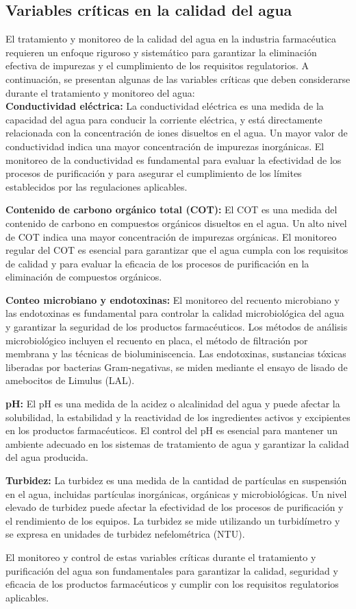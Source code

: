 \subsection{Variables críticas en la calidad del agua}

El tratamiento y monitoreo de la calidad del agua en la industria farmacéutica requieren un enfoque riguroso y sistemático para garantizar la eliminación efectiva de impurezas y el cumplimiento de los requisitos regulatorios. A continuación, se presentan algunas de las variables críticas que deben considerarse durante el tratamiento y monitoreo del agua:\\

\textbf{Conductividad eléctrica:} La conductividad eléctrica es una medida de la capacidad del agua para conducir la corriente eléctrica, y está directamente relacionada con la concentración de iones disueltos en el agua. Un mayor valor de conductividad indica una mayor concentración de impurezas inorgánicas. El monitoreo de la conductividad es fundamental para evaluar la efectividad de los procesos de purificación y para asegurar el cumplimiento de los límites establecidos por las regulaciones aplicables.

\textbf{Contenido de carbono orgánico total (COT):} El COT es una medida del contenido de carbono en compuestos
orgánicos disueltos en el agua. Un alto nivel de COT indica una mayor concentración de impurezas orgánicas.
El monitoreo regular del COT es esencial para garantizar que el agua cumpla con los requisitos de calidad y para evaluar la eficacia de los procesos de purificación en la eliminación de compuestos orgánicos.

\textbf{Conteo microbiano y endotoxinas:} El monitoreo del recuento microbiano y las endotoxinas es fundamental
para controlar la calidad microbiológica del agua y garantizar la seguridad de los productos farmacéuticos.
Los métodos de análisis microbiológico incluyen el recuento en placa, el método de filtración por membrana
y las técnicas de bioluminiscencia. Las endotoxinas, sustancias tóxicas liberadas por bacterias Gram-negativas,
se miden mediante el ensayo de lisado de amebocitos de Limulus (LAL).

\textbf{pH:} El pH es una medida de la acidez o alcalinidad del agua y puede afectar la solubilidad,
la estabilidad y la reactividad de los ingredientes activos y excipientes en los productos farmacéuticos.
El control del pH es esencial para mantener un ambiente adecuado en los sistemas de tratamiento de agua y
garantizar la calidad del agua producida.

\textbf{Turbidez:} La turbidez es una medida de la cantidad de partículas en suspensión en el agua, incluidas partículas inorgánicas, orgánicas y microbiológicas. Un nivel elevado de turbidez puede afectar la efectividad de los procesos de purificación y el rendimiento de los equipos. La turbidez se mide utilizando un turbidímetro y se expresa en unidades de turbidez nefelométrica (NTU).

El monitoreo y control de estas variables críticas durante el tratamiento y purificación del agua son fundamentales para garantizar la calidad, seguridad y eficacia de los productos farmacéuticos y cumplir con los requisitos regulatorios aplicables.
